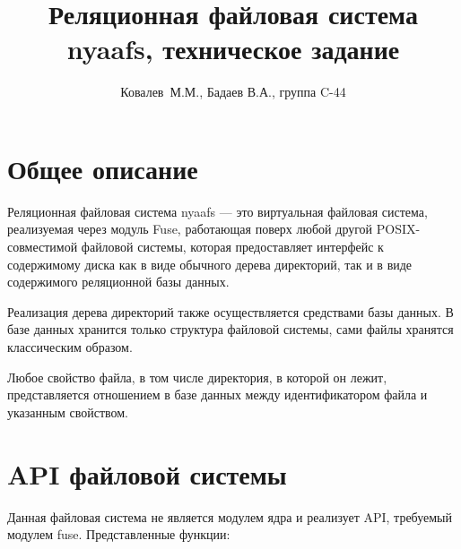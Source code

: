\documentclass[pdftex,a4paper,11pt]{article}
\author{Ковалев~М.М., Бадаев В.А., группа C-44}
\title{Реляционная файловая система nyaafs, техническое задание}
\begin{document}
\maketitle

\hypersetup{linkcolor=black}
\tableofcontents
\hypersetup{linkcolor=red}

\section{Общее описание}
Реляционная файловая система nyaafs --- это виртуальная файловая система, реализуемая через модуль Fuse, работающая поверх любой другой POSIX-совместимой файловой системы, которая предоставляет интерфейс к содержимому диска как в виде обычного дерева директорий, так и в виде содержимого реляционной базы данных.

Реализация дерева директорий также осуществляется средствами базы данных. В базе данных хранится только структура файловой системы, сами файлы хранятся классическим образом.

Любое свойство файла, в том числе директория, в которой он лежит, представляется отношением в базе данных между идентификатором файла и указанным свойством.

\section{API файловой системы}

Данная файловая система не является модулем ядра и реализует API, требуемый модулем fuse. Представленные функции:
\end{document}
